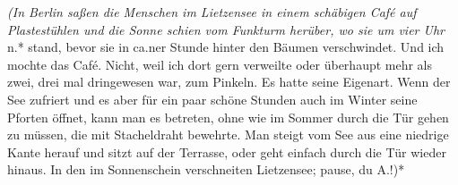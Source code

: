 \documentclass[
]{article}
\begin{document}
\emph{(In Berlin saßen die Menschen im Lietzensee in einem schäbigen
Café auf Plastestühlen und die Sonne schien vom Funkturm herüber, wo sie
um vier Uhr }n.* stand, bevor sie in ca.ner Stunde hinter den Bäumen
verschwindet. Und ich mochte das Café. Nicht, weil ich dort gern
verweilte oder überhaupt mehr als zwei, drei mal dringewesen war, zum
Pinkeln. Es hatte seine Eigenart. Wenn der See zufriert und es aber für
ein paar schöne Stunden auch im Winter seine Pforten öffnet, kann man es
betreten, ohne wie im Sommer durch die Tür gehen zu müssen, die mit
Stacheldraht bewehrte. Man steigt vom See aus eine niedrige Kante herauf
und sitzt auf der Terrasse, oder geht einfach durch die Tür wieder
hinaus. In den im Sonnenschein verschneiten Lietzensee; pause, du A.!)*
\end{document}
